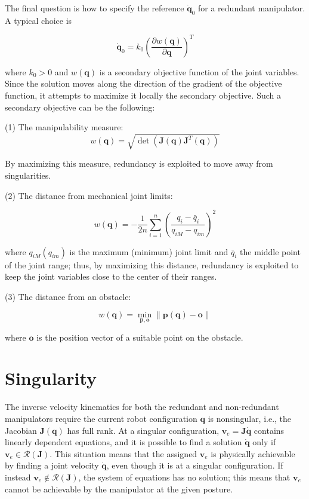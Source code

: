 \documentclass[10pt]{article}
\begin{document}
The final question is how to specify the reference $\dot{\boldsymbol{q}}_{0}$ for a redundant manipulator. A typical choice is

$$
\dot{\boldsymbol{q}}_{0}=k_{0}\left(\frac{\partial w(\boldsymbol{q})}{\partial \boldsymbol{q}}\right)^{T}
$$

where $k_{0}>0$ and $w(\boldsymbol{q})$ is a secondary objective function of the joint variables. Since the solution moves along the direction of the gradient of the objective function, it attempts to maximize it locally the secondary objective. Such a secondary objective can be the following:

(1) The manipulability measure:
  $$
w(\boldsymbol{q})=\sqrt{\operatorname{det}\left(\boldsymbol{J}(\boldsymbol{q}) \boldsymbol{J}^{T}(\boldsymbol{q})\right)}
$$

By maximizing this measure, redundancy is exploited to move away from singularities.

(2) The distance from mechanical joint limits:

  $$
w(\boldsymbol{q})=-\frac{1}{2 n} \sum_{i=1}^{n}\left(\frac{q_{i}-\bar{q}_{i}}{q_{i M}-q_{i m}}\right)^{2}
$$

where $q_{i M}\left(q_{i m}\right)$ is the maximum (minimum) joint limit and $\bar{q}_{i}$ the middle point of the joint range; thus, by maximizing this distance, redundancy is exploited to keep the joint variables close to the center of their ranges.


(3) The distance from an obstacle:

$$
w(\boldsymbol{q})=\min _{\boldsymbol{p}, \boldsymbol{o}}\|\boldsymbol{p}(\boldsymbol{q})-\boldsymbol{o}\|
$$

where $\boldsymbol{o}$ is the position vector of a suitable point on the obstacle. 


\section{Singularity}

The inverse velocity kinematics for both the redundant and non-redundant manipulators require the current robot configuration $\boldsymbol{q}$ is nonsingular, i.e., the Jacobian $\boldsymbol{J}(\boldsymbol{q})$ has full rank.
At a singular configuration,  $\boldsymbol{v}_{e}=\boldsymbol{J} \dot{\boldsymbol{q}}$ contains linearly dependent equations, and it is possible to find a solution $\dot{\boldsymbol{q}}$ only if $\boldsymbol{v}_{e} \in \mathcal{R}(\boldsymbol{J})$. This situation means that the assigned $\boldsymbol{v}_{e}$ is physically achievable by finding a joint velocity $ \dot{\boldsymbol{q}}$, even though it is at a singular configuration. If instead $\boldsymbol{v}_{e} \notin \mathcal{R}(\boldsymbol{J})$, the system of equations has no solution; this means that $\boldsymbol{v}_{e}$ 
 cannot be achievable by the manipulator at the given posture.
\end{document}
